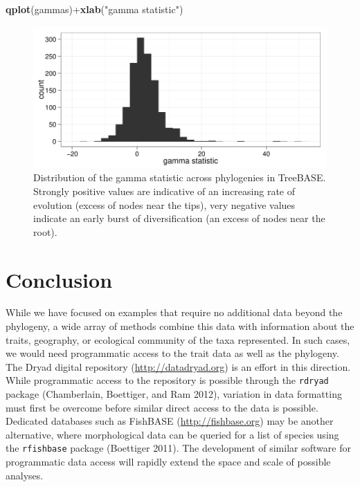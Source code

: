 \documentclass[author-year, 8pt, 3p]{elsarticle} %
\newenvironment{Shaded}{}{}
\newcommand{\KeywordTok}[1]{\textcolor[rgb]{0.00,0.44,0.13}{\textbf{{#1}}}}
\newcommand{\StringTok}[1]{\textcolor[rgb]{0.25,0.44,0.63}{{#1}}}
\newcommand{\NormalTok}[1]{{#1}}
\begin{document}
\begin{Shaded}
\begin{Highlighting}[]
\KeywordTok{qplot}\NormalTok{(gammas)+}\KeywordTok{xlab}\NormalTok{(}\StringTok{"gamma statistic"}\NormalTok{)}
\end{Highlighting}
\end{Shaded}
\begin{figure}[htbp]
\centering
\includegraphics{figure2.pdf}
\caption{Distribution of the gamma statistic across phylogenies in
TreeBASE. Strongly positive values are indicative of an increasing rate
of evolution (excess of nodes near the tips), very negative values
indicate an early burst of diversification (an excess of nodes near the
root).}
\end{figure}

\section{Conclusion}

While we have focused on examples that require no additional data beyond
the phylogeny, a wide array of methods combine this data with
information about the traits, geography, or ecological community of the
taxa represented. In such cases, we would need programmatic access to
the trait data as well as the phylogeny. The Dryad digital repository
(\href{http://datadryad.org}{http://datadryad.org}) is an effort in this
direction. While programmatic access to the repository is possible
through the \texttt{rdryad} package (Chamberlain, Boettiger, and Ram
2012), variation in data formatting must first be overcome before
similar direct access to the data is possible. Dedicated databases such
as FishBASE (\href{http://fishbase.org}{http://fishbase.org}) may be
another alternative, where morphological data can be queried for a list
of species using the \texttt{rfishbase} package (Boettiger 2011). The
development of similar software for programmatic data access will
rapidly extend the space and scale of possible analyses.
\end{document}
